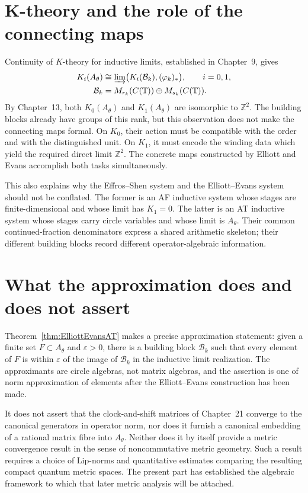 \documentclass{book}
\begin{document}
\section{K-theory and the role of the connecting maps}

Continuity of \(K\)-theory for inductive limits, established in
Chapter~9, gives
\begin{align*}
  K_i(A_\theta)
    &\cong
      \varinjlim\bigl(K_i(\mathcal B_k),(\varphi_k)_*\bigr),
      \qquad i=0,1,\\
  \mathcal B_k
    &=M_{r_k}(C(\mathbb T))\oplus M_{s_k}(C(\mathbb T)).
\end{align*}
By Chapter~13, both \(K_0(A_\theta)\) and \(K_1(A_\theta)\) are
isomorphic to \(\mathbb Z^2\).  The building blocks already have groups
of this rank, but this observation does not make the connecting maps
formal.  On \(K_0\), their action must be compatible with the order and
with the distinguished unit.  On \(K_1\), it must encode the winding data
which yield the required direct limit \(\mathbb Z^2\).  The concrete maps
constructed by Elliott and Evans accomplish both tasks simultaneously.

This also explains why the Effros--Shen system and the Elliott--Evans
system should not be conflated.  The former is an AF inductive system whose
stages are finite-dimensional and whose limit has \(K_1=0\).  The latter
is an AT inductive system whose stages carry circle variables and whose
limit is \(A_\theta\).  Their common continued-fraction denominators
express a shared arithmetic skeleton; their different building blocks
record different operator-algebraic information.

\section{What the approximation does and does not assert}

Theorem~\ref{thm:ElliottEvansAT} makes a precise approximation statement:
given a finite set \(F\subset A_\theta\) and \(\varepsilon>0\), there is
a building block \(\mathcal B_k\) such that every element of \(F\) is
within \(\varepsilon\) of the image of \(\mathcal B_k\) in the inductive
limit realization.  The approximants are circle algebras, not matrix
algebras, and the assertion is one of norm approximation of elements after
the Elliott--Evans construction has been made.

It does not assert that the clock-and-shift matrices of Chapter~21 converge
to the canonical generators in operator norm, nor does it furnish a
canonical embedding of a rational matrix fibre into \(A_\theta\).
Neither does it by itself provide a metric convergence result in the sense
of noncommutative metric geometry.  Such a result requires a choice of
Lip-norms and quantitative estimates comparing the resulting compact
quantum metric spaces.  The present part has established the algebraic
framework to which that later metric analysis will be attached.
\end{document}
